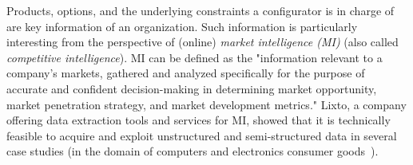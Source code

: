 
\wprv
 Products, options, and the underlying constraints a configurator is in charge of are key information of an organization. 
Such information is particularly interesting from the perspective of (online) \emph{market intelligence (MI)} (also called \emph{competitive intelligence}). 
MI can be defined as the "information relevant to a company's
markets, gathered and analyzed specifically for the purpose of accurate and confident decision-making in determining
market opportunity, market penetration strategy, and market development metrics." 
Lixto, a company offering data extraction tools and services for MI, showed that it is technically feasible to acquire and exploit unstructured and semi-structured data in several case studies (\eg in the domain of computers and electronics consumer goods~\cite{baumgartner2009}). %

